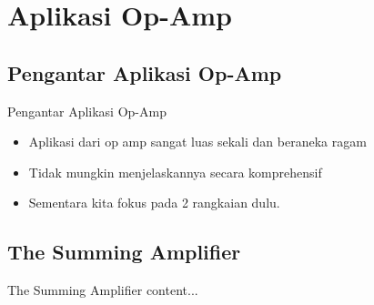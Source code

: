 \section{Aplikasi Op-Amp}

\subsection{Pengantar Aplikasi Op-Amp}
\begin{frame}{Pengantar Aplikasi Op-Amp}
	\begin{itemize}
		\item Aplikasi dari op amp sangat luas sekali dan beraneka ragam
		\item Tidak mungkin menjelaskannya secara komprehensif
		\item Sementara kita fokus pada 2 rangkaian dulu.
	\end{itemize}
\end{frame}

\subsection{The Summing Amplifier}
\begin{frame}{The Summing Amplifier}
	content...
\end{frame}